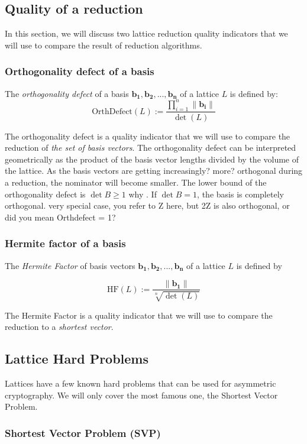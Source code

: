 \documentclass[10pt, a4paper]{article}
\newcommand{\my}[1]{{\color{blue} #1 }}
\renewcommand{\vec}[1]{\mathbf{#1}}
\begin{document}
\subsection{Quality of a reduction}

In this section, we will discuss two lattice reduction quality indicators that we will use to compare the result of reduction algorithms.

\subsubsection{Orthogonality defect of a basis}
The \emph{orthogonality defect} of a basis $\vec{b_1},\vec{b_2},...,\vec{b_n}$ of a lattice $L$ is defined by:
\[
    \text{OrthDefect}(L) := \frac{\displaystyle\prod^{n}_{i=1} \|\vec{b_i}\| }{\det(L)}
\]

The orthogonality defect is a quality indicator that we will use to compare the reduction of \emph{the set of basis vectors}. The orthogonality defect can be interpreted geometrically as the product of the basis vector lengths divided by the volume of the lattice. As the basis vectors are getting \my{increasingly? more?} orthogonal during a reduction, the nominator will become smaller. The lower bound of the orthogonality defect is $\det B \ge 1$ \my{why}. If $\det B = 1$, the basis is completely orthogonal. \my{very special case, you refer to Z here, but 2Z is also orthogonal, or did you mean Orthdefect = 1?}

\subsubsection{Hermite factor of a basis}
The \emph{Hermite Factor} of basis vectors $\vec{b_1}, \vec{b_2},...,\vec{b_n}$ of a lattice $L$ is defined by

\[
    \text{HF}(L) := \frac{\|\vec{b_1}\|}{\sqrt[n]{\det(L)}}
\]

The Hermite Factor is a quality indicator that we will use to compare the reduction to a \emph{shortest vector}.

\subsection{Lattice Hard Problems}

Lattices have a few known hard problems that can be used for asymmetric cryptography. We will only cover the most famous one, the Shortest Vector Problem.

\subsubsection{Shortest Vector Problem (SVP)}
\end{document}
